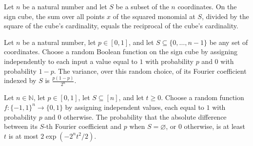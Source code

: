 \begin{theorem}
\label{FABL.sum_sq_normalized_monomial}
\leanok
{}
Let $n$ be a natural number and let $S$ be a subset of the $n$ coordinates. On the sign
cube, the sum over all points $x$ of the squared monomial at $S$, divided by the square
of the cube's cardinality, equals the reciprocal of the cube's cardinality.
\end{theorem}

\begin{theorem}
\label{FABL.variance_pBiasedRandomFunction_fourierCoeff}
\leanok
{}
Let $n$ be a natural number, let $p\in[0,1]$, and let $S\subseteq\{0,\ldots,n-1\}$ be
any set of coordinates. Choose a random Boolean function on the sign cube by assigning
independently to each input a value equal to $1$ with probability $p$ and $0$ with
probability $1-p$. The variance, over this random choice, of its Fourier coefficient
indexed by $S$ is $\frac{p(1-p)}{2^n}$.
\end{theorem}

\begin{theorem}
\label{FABL.measure_pBiasedRandomFunction_fourierCoeff_sub_mean_ge_le}
\leanok
{}
Let $n\in\mathbb{N}$, let $p\in[0,1]$, let $S\subseteq[n]$, and let $t\ge0$. Choose a
random function $f:\{-1,1\}^n\to\{0,1\}$ by assigning independent values, each equal to
$1$ with probability $p$ and $0$ otherwise. The probability that the absolute difference
between its $S$-th Fourier coefficient and $p$ when $S=\varnothing$, or $0$ otherwise,
is at least $t$ is at most $2\exp\!\left(-2^n t^2/2\right)$.
\end{theorem}

